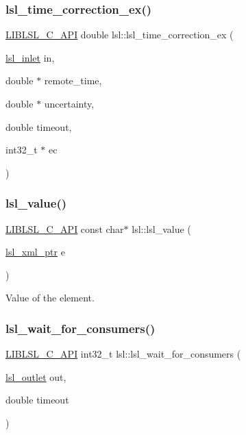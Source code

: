 \subsubsection{\texorpdfstring{lsl\+\_\+time\+\_\+correction\+\_\+ex()}{lsl\_time\_correction\_ex()}}
{\footnotesize\ttfamily \hyperlink{lsl__cpp_8h_aafd0ef1813e8be84a1420c4f1df64615}{L\+I\+B\+L\+S\+L\+\_\+\+C\+\_\+\+A\+PI} double lsl\+::lsl\+\_\+time\+\_\+correction\+\_\+ex (\begin{DoxyParamCaption}\item[{\hyperlink{namespacelsl_a884a3363cfcba75d7ce8f00c1c4c54f1}{lsl\+\_\+inlet}}]{in,  }\item[{double $\ast$}]{remote\+\_\+time,  }\item[{double $\ast$}]{uncertainty,  }\item[{double}]{timeout,  }\item[{int32\+\_\+t $\ast$}]{ec }\end{DoxyParamCaption})}

\mbox{\label{namespacelsl_a06b7b1f52525d931c57be7eb1216f50a}} 
\subsubsection{\texorpdfstring{lsl\+\_\+value()}{lsl\_value()}}
{\footnotesize\ttfamily \hyperlink{lsl__cpp_8h_aafd0ef1813e8be84a1420c4f1df64615}{L\+I\+B\+L\+S\+L\+\_\+\+C\+\_\+\+A\+PI} const char$\ast$ lsl\+::lsl\+\_\+value (\begin{DoxyParamCaption}\item[{\hyperlink{namespacelsl_a5edc7a49a1a1be1634fe6dce3d59c59b}{lsl\+\_\+xml\+\_\+ptr}}]{e }\end{DoxyParamCaption})}

Value of the element. \mbox{\label{namespacelsl_a0d69686f148209d1750e284a93942f19}} 
\subsubsection{\texorpdfstring{lsl\+\_\+wait\+\_\+for\+\_\+consumers()}{lsl\_wait\_for\_consumers()}}
{\footnotesize\ttfamily \hyperlink{lsl__cpp_8h_aafd0ef1813e8be84a1420c4f1df64615}{L\+I\+B\+L\+S\+L\+\_\+\+C\+\_\+\+A\+PI} int32\+\_\+t lsl\+::lsl\+\_\+wait\+\_\+for\+\_\+consumers (\begin{DoxyParamCaption}\item[{\hyperlink{namespacelsl_abcf512b0f66dacf86c10b165995fd50b}{lsl\+\_\+outlet}}]{out,  }\item[{double}]{timeout }\end{DoxyParamCaption})}

